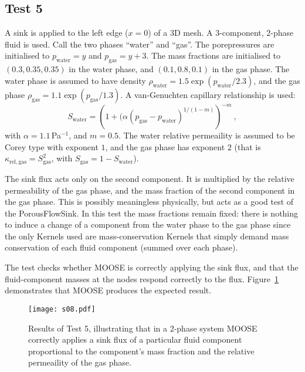 \subsection{Test 5}

A sink is applied to the left edge ($x=0$) of a 3D mesh.  A
3-component, 2-phase fluid is used.  Call the two phases ``water'' and
``gas''.  The porepressures are initialised to $p_{\mathrm{water}} =
y$ and $p_{\mathrm{gas}} = y + 3$.  The mass fractions are initialised
to $(0.3, 0.35, 0.35)$ in the water phase, and $(0.1, 0.8, 0.1)$ in
the gas phase.  The water phase is assumed to have density
$\rho_{\mathrm{water}} = 1.5 \exp(p_{\mathrm{water}}/2.3)$, and the gas phase
$\rho_{\mathrm{gas}} = 1.1 \exp(p_{\mathrm{gas}}/1.3)$.  A van-Genuchten capillary
relationship is used:
\begin{equation}
S_{\mathrm{water}} = \left( 1 + (\alpha (p_{\mathrm{gas}} - p_{\mathrm{water}})^{1/(1-m)} \right)^{-m} \ ,
\end{equation}
with $\alpha = 1.1$\,Pa$^{-1}$, and $m=0.5$.  The water relative
permeaility is assumed to be Corey type with exponent $1$, and the gas
phase has exponent $2$ (that is $\kappa_{\mathrm{rel,gas}} =
S_{\mathrm{gas}}^{2}$, with $S_{\mathrm{gas}} = 1 -
S_{\mathrm{water}}$).

The sink flux acts only on the second component.  It is multiplied by the
relative permeability of the gas phase, and the mass fraction of the
second component in the gas phase.  This is possibly meaningless
physically, but acts as a good test of the PorousFlowSink.  In this
test the mass fractions remain fixed: there is nothing to induce a
change of a component from the water phase to the gas phase since the
only Kernels used are mass-conservation Kernels that simply demand
mass conservation of each fluid component (summed over each phase).

The test checks whether MOOSE is correctly applying the sink flux, and
that the fluid-component masses at the nodes respond correctly to the
flux.  Figure~\ref{s08.fig} demonstrates that MOOSE produces the
expected result.

\begin{figure}[htb]
\begin{center}
\texttt{[image: s08.pdf]}
\caption{Results of Test 5, illustrating that in a 2-phase system
  MOOSE correctly applies a sink flux of a particular fluid component
  proportional to the component's mass fraction and the relative
  permeaility of the gas phase.}
\label{s08.fig}
\end{center}
\end{figure}



